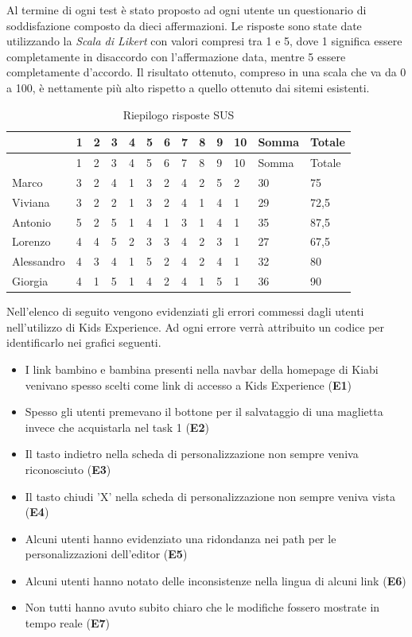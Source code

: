 \documentclass[12pt,italian,]{report}
\providecommand{\tightlist}{%
  \setlength{\itemsep}{0pt}\setlength{\parskip}{0pt}}
\begin{document}
Al termine di ogni test è stato proposto ad ogni utente un questionario
di soddisfazione composto da dieci affermazioni. Le risposte sono state
date utilizzando la \emph{Scala di Likert} con valori compresi tra 1 e
5, dove 1 significa essere completamente in disaccordo con
l'affermazione data, mentre 5 essere completamente d'accordo. Il
risultato ottenuto, compreso in una scala che va da 0 a 100, è
nettamente più alto rispetto a quello ottenuto dai sitemi esistenti.

\begin{longtable}[]{@{}lllllllllllll@{}}
\caption{Riepilogo risposte SUS}\tabularnewline
\toprule
& 1 & 2 & 3 & 4 & 5 & 6 & 7 & 8 & 9 & 10 & Somma & Totale\tabularnewline
\midrule
\endfirsthead
\toprule
& 1 & 2 & 3 & 4 & 5 & 6 & 7 & 8 & 9 & 10 & Somma & Totale\tabularnewline
\midrule
\endhead
Marco & 3 & 2 & 4 & 1 & 3 & 2 & 4 & 2 & 5 & 2 & 30 & 75\tabularnewline
Viviana & 3 & 2 & 2 & 1 & 3 & 2 & 4 & 1 & 4 & 1 & 29 &
72,5\tabularnewline
Antonio & 5 & 2 & 5 & 1 & 4 & 1 & 3 & 1 & 4 & 1 & 35 &
87,5\tabularnewline
Lorenzo & 4 & 4 & 5 & 2 & 3 & 3 & 4 & 2 & 3 & 1 & 27 &
67,5\tabularnewline
Alessandro & 4 & 3 & 4 & 1 & 5 & 2 & 4 & 2 & 4 & 1 & 32 &
80\tabularnewline
Giorgia & 4 & 1 & 5 & 1 & 4 & 2 & 4 & 1 & 5 & 1 & 36 & 90\tabularnewline
\bottomrule
\end{longtable}

Nell'elenco di seguito vengono evidenziati gli errori commessi dagli
utenti nell'utilizzo di Kids Experience. Ad ogni errore verrà attribuito
un codice per identificarlo nei grafici seguenti.

\begin{itemize}
\tightlist
\item I link bambino e bambina presenti nella navbar della homepage di Kiabi venivano spesso scelti come link di accesso a Kids Experience (\textbf{E1})
\item Spesso gli utenti premevano il bottone per il salvataggio di una maglietta invece che acquistarla nel task 1 (\textbf{E2})
\item Il tasto indietro nella scheda di personalizzazione non sempre veniva riconosciuto (\textbf{E3})
\item Il tasto chiudi 'X' nella scheda di personalizzazione non sempre veniva vista (\textbf{E4})
\item Alcuni utenti hanno evidenziato una ridondanza nei path per le personalizzazioni dell'editor (\textbf{E5})
\item Alcuni utenti hanno notato delle inconsistenze nella lingua di alcuni link (\textbf{E6})
\item Non tutti hanno avuto subito chiaro che le modifiche fossero mostrate in tempo reale (\textbf{E7})
\end{itemize}
\end{document}
